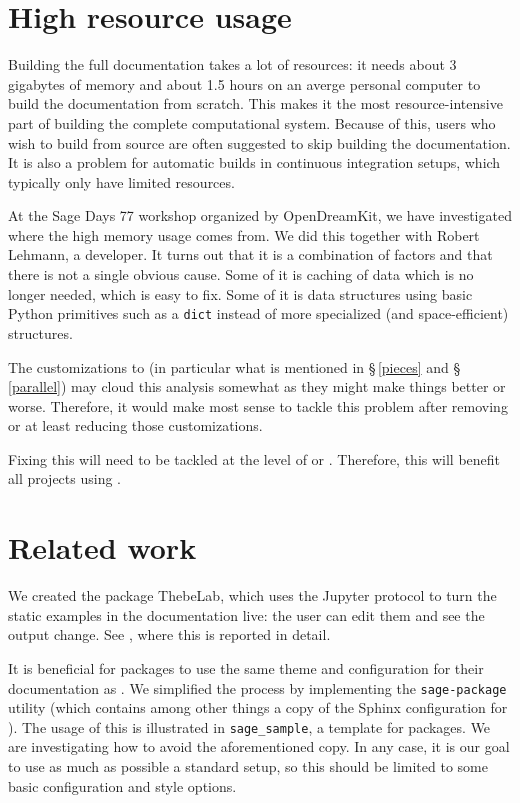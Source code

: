 \documentclass{deliverablereport}
\begin{document}
\section{High resource usage}

Building the full \Sage documentation takes a lot of resources:
it needs about 3 gigabytes of memory and about 1.5 hours
on an averge personal computer to build the documentation from scratch.
This makes it the most resource-intensive part of
building the complete \Sage computational system.
Because of this, \Sage users who wish to build from source are often
suggested to skip building the \Sage documentation.
It is also a problem for automatic builds in continuous integration
setups, which typically only have limited resources.

At the Sage Days 77 workshop organized by OpenDreamKit,
we have investigated where the high memory usage comes from.
We did this together with Robert Lehmann, a \Sphinx developer.
It turns out that it is a combination of factors
and that there is not a single obvious cause.
Some of it is caching of data which is no longer needed,
which is easy to fix.
Some of it is data structures using basic Python primitives such as a \texttt{dict}
instead of more specialized (and space-efficient) structures.

The \Sage customizations to \Sphinx
(in particular what is mentioned in \S\,\ref{pieces} and \S\,\ref{parallel})
may cloud this analysis somewhat
as they might make things better or worse.
Therefore, it would make most sense to tackle this problem after
removing or at least reducing those customizations.

Fixing this will need to be tackled at the level
of \Docutils or \Sphinx.
Therefore, this will benefit all projects using \Sphinx.

\section{Related work}

We created the package ThebeLab, which uses the Jupyter protocol
to turn the static examples in the documentation live:
the user can edit them and see the output change.
See , where this is reported in detail.

It is beneficial for \Sage packages to use the same theme
and configuration for their documentation as \Sage.
We simplified the process by implementing the \verb/sage-package/ utility
(which contains among other things a copy of the Sphinx configuration for \Sage).
The usage of this is illustrated in \verb/sage_sample/,
a template for \Sage packages.
We are investigating how to avoid the aforementioned copy.
In any case, it is our goal to use as much as possible a standard \Sphinx setup,
so this should be limited to some basic configuration and style options.
\end{document}
